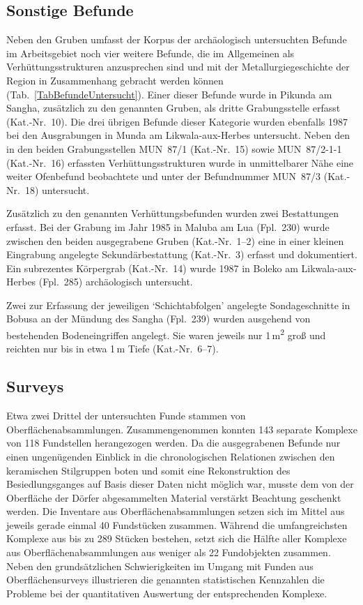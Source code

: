 \subsection{Sonstige Befunde}

Neben den Gruben umfasst der Korpus der archäologisch untersuchten Befunde im Arbeitsgebiet noch vier weitere Befunde, die im Allgemeinen als Verhüttungsstrukturen anzusprechen sind und mit der Metallurgiegeschichte der Region in Zusammenhang gebracht werden können (Tab.~\ref{TabBefundeUntersucht}). Einer dieser Befunde wurde in Pikunda am Sangha, zusätzlich zu den genannten Gruben, als dritte Grabungsstelle erfasst (Kat.-Nr.~10). Die drei übrigen Befunde dieser Kategorie wurden ebenfalls 1987 bei den Ausgrabungen in Munda am Likwala-aux-Herbes untersucht. Neben den in den beiden Grabungsstellen MUN~87/1 (Kat.-Nr.~15) sowie MUN~87/2-1-1 (Kat.-Nr.~16) erfassten Verhüttungsstrukturen wurde in unmittelbarer Nähe eine weiter Ofenbefund beobachtete und unter der Befundnummer MUN~87/3 (Kat.-Nr.~18) untersucht.

Zusätzlich zu den genannten Verhüttungsbefunden wurden zwei Bestattungen erfasst. Bei der Grabung im Jahr 1985 in Maluba am Lua (Fpl.~230) wurde zwischen den beiden ausgegrabene Gruben (Kat.-Nr.~1--2) eine in einer kleinen Eingrabung angelegte Sekundärbestattung (Kat.-Nr.~3) erfasst und dokumentiert. Ein subrezentes Körpergrab (Kat.-Nr.~14) wurde 1987 in Boleko am Likwala-aux-Herbes (Fpl.~285) archäologisch untersucht.

Zwei zur Erfassung der jeweiligen \enquote*{Schichtabfolgen} angelegte Sondageschnitte in Bobusa an der Mündung des Sangha (Fpl.~239) wurden ausgehend von bestehenden Bodeneingriffen angelegt. Sie waren jeweils nur 1\,m\textsuperscript{2} groß und reichten nur bis in etwa 1\,m Tiefe (Kat.-Nr.~6--7).


\subsection{Surveys}

Etwa zwei Drittel der untersuchten Funde stammen von Oberflächenabsammlungen. Zusammengenommen konnten 143 separate Komplexe von 118 Fundstellen herangezogen werden. Da die ausgegrabenen Befunde nur einen ungenügenden Einblick in die chronologischen Relationen zwischen den keramischen Stilgruppen boten und somit eine Rekonstruktion des Besiedlungsganges auf Basis dieser Daten nicht möglich war, musste dem von der Oberfläche der Dörfer abgesammelten Material verstärkt Beachtung geschenkt werden. Die Inventare aus Oberflächenabsammlungen setzen sich im Mittel aus jeweils gerade einmal 40 Fundstücken zusammen. Während die umfangreichsten Komplexe aus bis zu 289 Stücken bestehen, setzt sich die Hälfte aller Komplexe aus Oberflächenabsammlungen aus weniger als 22 Fundobjekten zusammen. Neben den grundsätzlichen Schwierigkeiten im Umgang mit Funden aus Oberflächensurveys illustrieren die genannten statistischen Kennzahlen die Probleme bei der quantitativen Auswertung der entsprechenden Komplexe.

